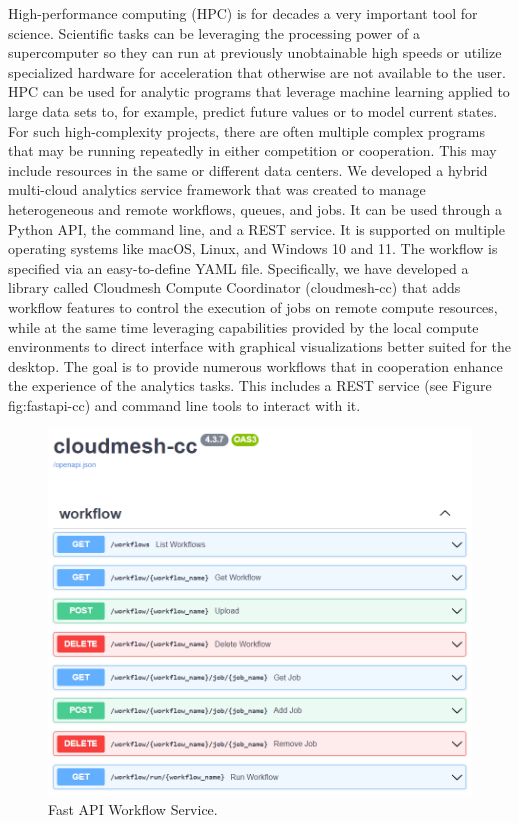 \documentclass[utf8]{FrontiersinVancouver} %
\begin{document}
High-performance computing (HPC) is for decades a very important tool
for science. Scientific tasks can be leveraging the processing power
of a supercomputer so they can run at previously unobtainable high
speeds or utilize specialized hardware for acceleration that otherwise
are not available to the user. HPC can be used for analytic programs
that leverage machine learning applied to large data sets to, for
example, predict future values or to model current states. For such
high-complexity projects, there are often multiple complex programs
that may be running repeatedly in either competition or cooperation.
This may include resources in the same or different data centers. We
developed a hybrid multi-cloud analytics service framework that was
created to manage heterogeneous and remote workflows, queues, and
jobs.  It can be used through a Python API, the command line, and a
REST service. It is supported on multiple operating systems like
macOS, Linux, and Windows 10 and 11.  The workflow is specified via an
easy-to-define YAML file.  Specifically, we have developed a library
called Cloudmesh Compute Coordinator (cloudmesh-cc)
\citep{las-22-arxiv-workflow-cc} that adds workflow features to
control the execution of jobs on remote compute resources, while at
the same time leveraging capabilities provided by the local compute
environments to direct interface with graphical visualizations better
suited for the desktop. The goal is to provide numerous workflows that
in cooperation enhance the experience of the analytics tasks. This
includes a REST service (see Figure {fig:fastapi-cc}) and command line
tools to interact with it.


\begin{figure}[htb]
\centering\includegraphics[width=0.7\columnwidth]{images/fastapi-service.png}
\caption{Fast API Workflow Service.}
\label{fig:fastapi-cc}
\end{figure}
\end{document}
